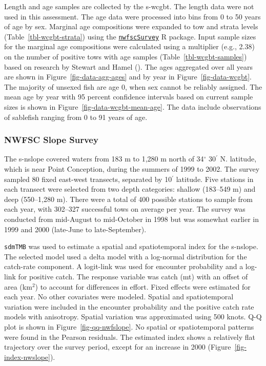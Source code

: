 \documentclass[
  english,
]{article}
\begin{document}
Length and age samples are collected by the \gls{s-wcgbt}. The length
data were not used in this assessment. The age data were processed into
bins from 0 to 50 years of age by sex. Marginal age compositions were
expanded to tow and strata levels (Table~\ref{tbl-wcgbt-strata}) using
the
\href{https://pfmc-assessments.github.io/nwfscSurvey/}{\texttt{nwfscSurvey}}
R package. Input sample sizes for the marginal age compositions were
calculated using a multiplier (e.g., 2.38) on the number of positive
tows with age samples (Table~\ref{tbl-wcgbt-samples}) based on research
by Stewart and Hamel ().
The ages aggregated over all years are shown in
Figure~\ref{fig-data-agg-ages} and by year in
Figure~\ref{fig-data-wcgbt}. The majority of unsexed fish are age 0,
when sex cannot be reliably assigned. The mean age by year with 95
percent confidence intervals based on current sample sizes is shown in
Figure~\ref{fig-data-wcgbt-mean-age}. The data include observations of
sablefish ranging from 0 to 91 years of age.

\subsubsection{NWFSC Slope Survey}\label{nslope-data}

The \gls{s-nslope} covered waters from 183 m to 1,280 m north of
34\(^\circ\) 30\(^\prime\) N. latitude, which is near Point Conception,
during the summers of 1999 to 2002. The survey sampled 80 fixed
east-west transects, separated by 10\(^\prime\) latitude. Five stations
in each transect were selected from two depth categories: shallow
(183--549 m) and deep (550--1,280 m). There were a total of 400 possible
stations to sample from each year, with 302--327 successful tows on
average per year. The survey was conducted from mid-August to
mid-October in 1998 but was somewhat earlier in 1999 and 2000 (late-June
to late-September).

\texttt{sdmTMB} was used to estimate a spatial and spatiotemporal index
for the \gls{s-nslope}. The selected model used a delta model with a
log-normal distribution for the catch-rate component. A logit-link was
used for encounter probability and a log-link for positive catch. The
response variable was catch (mt) with an offset of area (km\(^2\)) to
account for differences in effort. Fixed effects were estimated for each
year. No other covariates were modeled. Spatial and spatiotemporal
variation were included in the encounter probability and the positive
catch rate models with anisotropy. Spatial variation was approximated
using 500 knots. Q-Q plot is shown in Figure~\ref{fig-qq-nwfslope}. No
spatial or spatiotemporal patterns were found in the Pearson residuals.
The estimated index shows a relatively flat trajectory over the survey
period, except for an increase in 2000 (Figure~\ref{fig-index-nwslope}).
\end{document}
